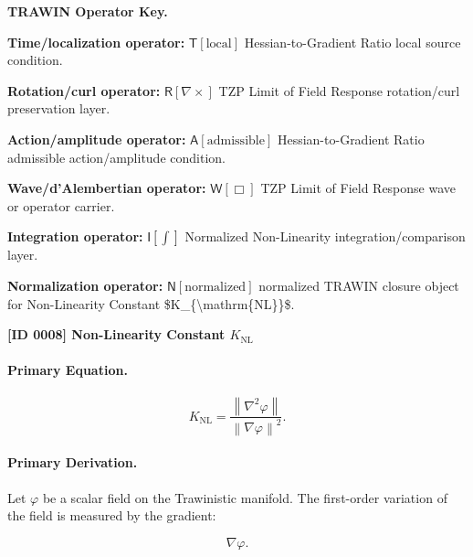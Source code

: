 \par\vspace{0.45\baselineskip}
\noindent\begin{minipage}[t]{\linewidth}
\begingroup
\small
\raggedright
\textbf{TRAWIN Operator Key.}\par
\noindent\textbf{Time/localization operator:} $\mathsf{T}\!\left[\mathrm{local}\right]$ Hessian-to-Gradient Ratio local source condition.\par
\noindent\textbf{Rotation/curl operator:} $\mathsf{R}\!\left[\nabla\times\right]$ TZP Limit of Field Response rotation/curl preservation layer.\par
\noindent\textbf{Action/amplitude operator:} $\mathsf{A}\!\left[\mathrm{admissible}\right]$ Hessian-to-Gradient Ratio admissible action/amplitude condition.\par
\noindent\textbf{Wave/d'Alembertian operator:} $\mathsf{W}\!\left[\Box\right]$ TZP Limit of Field Response wave or operator carrier.\par
\noindent\textbf{Integration operator:} $\mathsf{I}\!\left[\int\right]$ Normalized Non-Linearity integration/comparison layer.\par
\noindent\textbf{Normalization operator:} $\mathsf{N}\!\left[\mathrm{normalized}\right]$ normalized TRAWIN closure object for Non-Linearity Constant \$K\_\{\textbackslash{}mathrm\{NL\}\}\$.\par
\endgroup
\end{minipage}

\clearpage
\noindent\textbf{[ID 0008] Non-Linearity Constant $K_{\mathrm{NL}}$}\par
\vspace{0.35em}
\paragraph{Primary Equation.}
\begin{equation}
K_{\mathrm{NL}}
=
\frac{\left\lVert \nabla^{2}\varphi\right\rVert}
{\left\lVert \nabla\varphi\right\rVert^{2}} .
\end{equation}

\paragraph{Primary Derivation.}
Let $\varphi$ be a scalar field on the Trawinistic manifold.  
The first-order variation of the field is measured by the gradient:

\begin{equation}
\nabla\varphi .
\end{equation}

